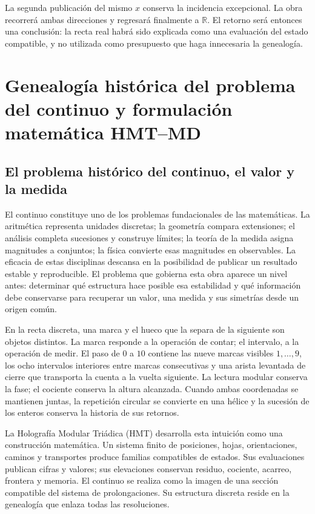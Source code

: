 La segunda publicación del mismo \(x\) conserva la incidencia excepcional.
La obra recorrerá ambas direcciones y regresará finalmente a
\(\mathbb R\). El retorno será entonces una conclusión: la recta real habrá
sido explicada como una evaluación del estado compatible, y no utilizada
como presupuesto que haga innecesaria la genealogía.


\section{Genealogía histórica del problema del continuo y formulación matemática HMT–MD}

\subsection*{El problema histórico del continuo, el valor y la medida}

El continuo constituye uno de los problemas fundacionales de las
matemáticas. La aritmética representa unidades discretas; la geometría
compara extensiones; el análisis completa sucesiones y construye límites; la
teoría de la medida asigna magnitudes a conjuntos; la física convierte esas
magnitudes en observables. La eficacia de estas disciplinas descansa en la
posibilidad de publicar un resultado estable y reproducible. El problema que
gobierna esta obra aparece un nivel antes: determinar qué estructura hace
posible esa estabilidad y qué información debe conservarse para recuperar un
valor, una medida y sus simetrías desde un origen común.

En la recta discreta, una marca y el hueco que la separa de la siguiente son
objetos distintos. La marca responde a la operación de contar; el intervalo,
a la operación de medir. El paso de \(0\) a \(10\) contiene las nueve marcas
visibles \(1,\ldots,9\), los ocho intervalos interiores entre marcas
consecutivas y una arista levantada de cierre que transporta la cuenta a la
vuelta siguiente. La lectura modular conserva la fase; el cociente conserva
la altura alcanzada. Cuando ambas coordenadas se mantienen juntas, la
repetición circular se convierte en una hélice y la sucesión de los enteros
conserva la historia de sus retornos.

La Holografía Modular Triádica (HMT) desarrolla esta intuición como una
construcción matemática. Un sistema finito de posiciones, hojas,
orientaciones, caminos y transportes produce familias compatibles de estados.
Sus evaluaciones publican cifras y valores; sus elevaciones conservan
residuo, cociente, acarreo, frontera y memoria. El continuo se realiza como
la imagen de una sección compatible del sistema de prolongaciones. Su
estructura discreta reside en la genealogía que enlaza todas las
resoluciones.

